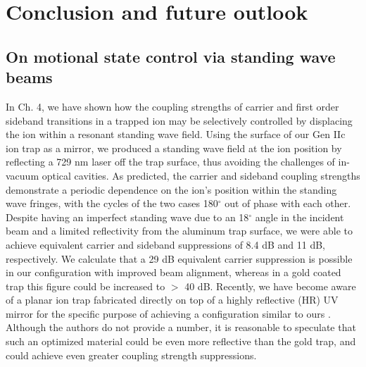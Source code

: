 \chapter{Conclusion and future outlook}


\section{On motional state control via standing wave beams}

In Ch. 4, we have shown how the coupling strengths of carrier and first order sideband transitions in a trapped ion may be selectively controlled by displacing the ion within a resonant standing wave field. Using the surface of our Gen IIc ion trap as a mirror, we produced a standing wave field at the ion position by reflecting a 729 nm laser off the trap surface, thus avoiding the challenges of in-vacuum optical cavities. As predicted, the carrier and sideband coupling strengths demonstrate a periodic dependence on the ion's position within the standing wave fringes, with the cycles of the two cases 180$^{\circ}$ out of phase with each other. Despite having an imperfect standing wave due to an 18$^{\circ}$ angle in the incident beam and a limited reflectivity from the aluminum trap surface, we were able to achieve equivalent carrier and sideband suppressions of 8.4 dB and 11 dB, respectively. We calculate that a 29 dB equivalent carrier suppression is possible in our configuration with improved beam alignment, whereas in a gold coated trap this figure could be increased to $>$ 40 dB. Recently, we have become aware of a planar ion trap fabricated directly on top of a highly reflective (HR) UV mirror for the specific purpose of achieving a configuration similar to ours \cite{doi:10.1063/1.4970542}. Although the authors do not provide a number, it is reasonable to speculate that such an optimized material could be even more reflective than the gold trap, and could achieve even greater coupling strength suppressions.

